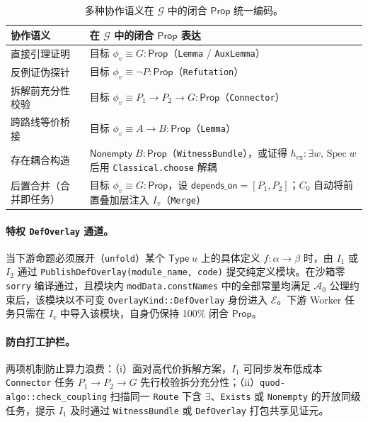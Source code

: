 \documentclass[10pt,a4paper,fontset=fandol]{ctexart}
\newcommand{\Truth}{\mathcal{E}}
\newcommand{\Orch}{\mathcal{G}}
\newcommand{\Prop}{\mathsf{Prop}}
\newcommand{\TypeU}{\mathsf{Type}\;u}
\newcommand{\AxiomsZero}{\mathcal{A}_0}
\newcommand{\kw}[1]{\mathsf{#1}}
\newcommand{\code}[1]{\texttt{#1}}
\begin{document}
\begin{table}[t]
\centering
\caption{多种协作语义在 $\Orch$ 中的闭合 $\Prop$ 统一编码。}
\label{tab:closed-prop}
\small
\begin{tabular}{@{}ll@{}}
\toprule
\textbf{协作语义} & \textbf{在 $\Orch$ 中的闭合 $\Prop$ 表达} \\
\midrule
直接引理证明 & 目标 $\phi_v \equiv G : \Prop$（\code{Lemma} / \code{AuxLemma}） \\
反例证伪探针 & 目标 $\phi_v \equiv \neg P : \Prop$（\code{Refutation}） \\
拆解前充分性校验 & 目标 $\phi_v \equiv P_1 \to P_2 \to G : \Prop$（\code{Connector}） \\
跨路线等价桥接 & 目标 $\phi_v \equiv A \to B : \Prop$（\code{Lemma}） \\
存在耦合构造 & $\kw{Nonempty}\; B : \Prop$（\code{WitnessBundle}），或证得 $h_{\mathrm{ex}} : \exists w,\, \mathrm{Spec}\; w$ 后用 \code{Classical.choose} 解耦 \\
后置合并（合并即任务） & 目标 $\phi_v \equiv G : \Prop$，设 $\kw{depends\_on} = [P_1, P_2]$；$C_0$ 自动将前置叠加层注入 $I_v$（\code{Merge}） \\
\bottomrule
\end{tabular}
\end{table}

\paragraph{特权 \code{DefOverlay} 通道。}
当下游命题必须展开（\code{unfold}）某个 $\TypeU$ 上的具体定义 $f : \alpha \to \beta$ 时，由 $I_1$ 或 $I_2$ 通过 \code{PublishDefOverlay(module\_name, code)} 提交纯定义模块。在沙箱零 \code{sorry} 编译通过，且模块内 \code{modData.constNames} 中的全部常量均满足 $\AxiomsZero$ 公理约束后，该模块以不可变 \code{OverlayKind::DefOverlay} 身份进入 $\Truth$。下游 Worker 任务只需在 $I_v$ 中导入该模块，自身仍保持 100\% 闭合 $\Prop$。

\paragraph{防白打工护栏。}
两项机制防止算力浪费：（i）面对高代价拆解方案，$I_1$ 可同步发布低成本 \code{Connector} 任务 $P_1 \to P_2 \to G$ 先行校验拆分充分性；（ii）\code{quod-algo::check\_coupling} 扫描同一 \code{Route} 下含 $\exists$、\code{Exists} 或 \code{Nonempty} 的开放同级任务，提示 $I_1$ 及时通过 \code{WitnessBundle} 或 \code{DefOverlay} 打包共享见证元。
\end{document}
